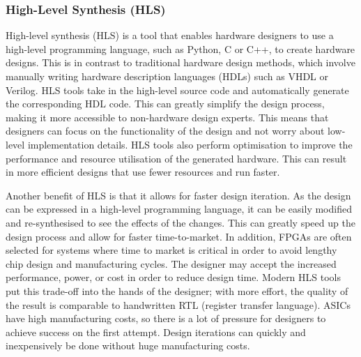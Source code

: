 \subsubsection{High-Level Synthesis (HLS)}
High-level synthesis (HLS) is a tool that enables hardware designers to use a high-level programming language, such as Python, C or C++, to create hardware designs. This is in contrast to traditional hardware design methods, which involve manually writing hardware description languages (HDLs) such as VHDL or Verilog. HLS tools take in the high-level source code and automatically generate the corresponding HDL code. This can greatly simplify the design process, making it more accessible to non-hardware design experts. This means that designers can focus on the functionality of the design and not worry about low-level implementation details. HLS tools also perform optimisation to improve the performance and resource utilisation of the generated hardware. This can result in more efficient designs that use fewer resources and run faster.


Another benefit of HLS is that it allows for faster design iteration. As the design can be expressed in a high-level programming language, it can be easily modified and re-synthesised to see the effects of the changes. This can greatly speed up the design process and allow for faster time-to-market. In addition, FPGAs are often selected for systems where time to market is critical in order to avoid lengthy chip design and manufacturing cycles. The designer may accept the increased performance, power, or cost in order to reduce design time. Modern HLS tools put this trade-off into the hands of the designer; with more effort, the quality of the result is comparable to handwritten RTL (register transfer language). ASICs have high manufacturing costs, so there is a lot of pressure for designers to achieve success on the first attempt. Design iterations can quickly and inexpensively be done without huge manufacturing costs.

